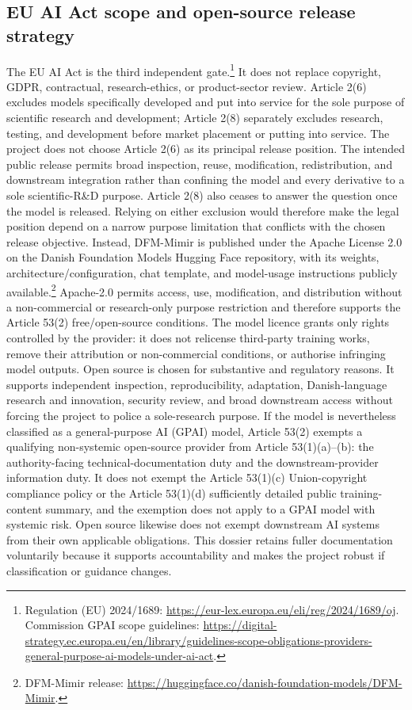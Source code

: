 \documentclass[9pt,a4paper]{article}
\begin{document}
\subsection{EU AI Act scope and open-source release strategy}
The EU AI Act is the third independent gate.\footnote{Regulation (EU) 2024/1689: \url{https://eur-lex.europa.eu/eli/reg/2024/1689/oj}. Commission GPAI scope guidelines: \url{https://digital-strategy.ec.europa.eu/en/library/guidelines-scope-obligations-providers-general-purpose-ai-models-under-ai-act}.} It does not replace copyright, GDPR, contractual, research-ethics, or product-sector review. Article 2(6) excludes models specifically developed and put into service for the sole purpose of scientific research and development; Article 2(8) separately excludes research, testing, and development before market placement or putting into service. The project does not choose Article 2(6) as its principal release position. The intended public release permits broad inspection, reuse, modification, redistribution, and downstream integration rather than confining the model and every derivative to a sole scientific-R\&D purpose. Article 2(8) also ceases to answer the question once the model is released. Relying on either exclusion would therefore make the legal position depend on a narrow purpose limitation that conflicts with the chosen release objective.
Instead, DFM-Mimir is published under the Apache License 2.0 on the Danish Foundation Models Hugging Face repository, with its weights, architecture/configuration, chat template, and model-usage instructions publicly available.\footnote{DFM-Mimir release: \url{https://huggingface.co/danish-foundation-models/DFM-Mimir}.} Apache-2.0 permits access, use, modification, and distribution without a non-commercial or research-only purpose restriction and therefore supports the Article 53(2) free/open-source conditions. The model licence grants only rights controlled by the provider: it does not relicense third-party training works, remove their attribution or non-commercial conditions, or authorise infringing model outputs.
Open source is chosen for substantive and regulatory reasons. It supports independent inspection, reproducibility, adaptation, Danish-language research and innovation, security review, and broad downstream access without forcing the project to police a sole-research purpose. If the model is nevertheless classified as a general-purpose AI (GPAI) model, Article 53(2) exempts a qualifying non-systemic open-source provider from Article 53(1)(a)--(b): the authority-facing technical-documentation duty and the downstream-provider information duty. It does not exempt the Article 53(1)(c) Union-copyright compliance policy or the Article 53(1)(d) sufficiently detailed public training-content summary, and the exemption does not apply to a GPAI model with systemic risk. Open source likewise does not exempt downstream AI systems from their own applicable obligations. This dossier retains fuller documentation voluntarily because it supports accountability and makes the project robust if classification or guidance changes.
\end{document}
